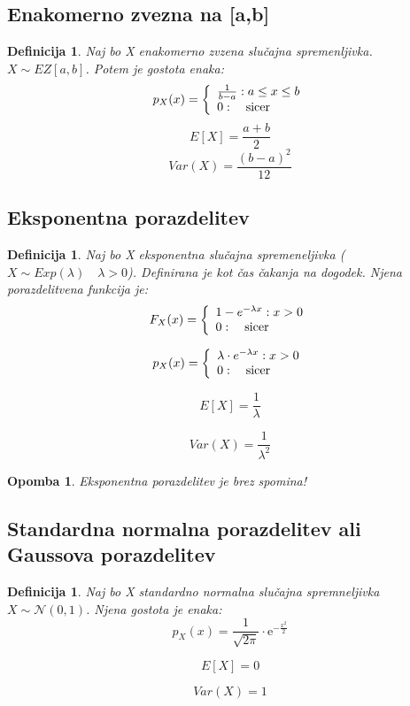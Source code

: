 \documentclass[11pt]{article}
\newtheorem{Definicija}[Izrek]{{\sc Definicija}}
\newtheorem{Opomba}[Izrek]{{\sc Opomba}}
\begin{document}
\subsection{Enakomerno zvezna na [a,b] }
\begin{Definicija}
	Naj bo X enakomerno zvzena slučajna spremenljivka. $X \sim EZ[a,b]$. Potem je gostota enaka:
	$$ p_X(x) = \left \{\begin{array}{lr}
	\frac{1}{b-a} : a\le x\le b \\ 0 :\quad \textnormal{sicer}
	  \end{array}
	  \right.
	$$
	$$E[X] = \frac{a+b}{2}$$
	$$Var(X) = \frac{(b-a)^2}{12}$$
\end{Definicija}
\subsection{Eksponentna porazdelitev}
\begin{Definicija}
	Naj bo X eksponentna slučajna spremeneljivka ($X\sim Exp(\lambda) \quad \lambda >0$). Definirana je kot čas čakanja na dogodek.
	Njena porazdelitvena funkcija je:
		$$ F_X(x) = \left \{\begin{array}{lr}
		1 - e^{-\lambda x}:  x>0 
		\\
		0 :\quad \textnormal{sicer}
		\end{array}\right.$$
		
		$$ p_X(x) = \left \{\begin{array}{lr}
		\lambda\cdot e^{-\lambda x} : x>0
		\\
		0 :\quad \textnormal{sicer}
		\end{array}
		\right.
		$$
		
		$$E[X] = \frac{1}{\lambda}$$
		
		$$Var(X) = \frac{1}{\lambda^2}$$
\end{Definicija}
\begin{Opomba}
	Eksponentna porazdelitev je brez spomina!
\end{Opomba}
\subsection{Standardna normalna porazdelitev ali Gaussova porazdelitev}
\begin{Definicija}
	Naj bo X standardno normalna slučajna spremneljivka $X\sim \mathcal{N}(0,1)$.
	Njena gostota je enaka:
	$$p_X(x) = \frac{1}{\sqrt{2\pi}}\cdot \mathrm{e}^{-\frac{x^2}{2}}$$
	
	$$E[X] = 0$$
	
	$$Var(X) = 1$$
\end{Definicija}
\end{document}

